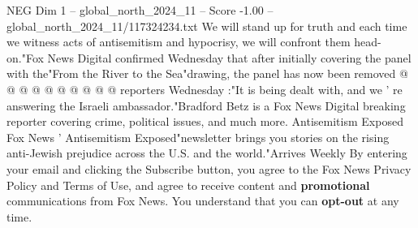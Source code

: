 \begin{textsample}{NEG Dim 1 – global\_north\_2024\_11 – Score -1.00 – global\_north\_2024\_11/117324234.txt}
We will stand up for truth and each time we witness acts of antisemitism and hypocrisy, we will confront them head-on."Fox News Digital confirmed Wednesday that after initially covering the panel with the"From the River to the Sea"drawing, the panel has now been removed @ @ @ @ @ @ @ @ @ @ reporters Wednesday :"It is being dealt with, and we ' re answering the Israeli ambassador."Bradford Betz is a Fox News Digital breaking reporter covering crime, political issues, and much more.
Antisemitism Exposed Fox News ' Antisemitism Exposed"newsletter brings you stories on the rising anti-Jewish prejudice across the U.S. and the world."Arrives Weekly By entering your email and clicking the Subscribe button, you agree to the Fox News Privacy Policy and Terms of Use, and agree to receive content and \textbf{promotional} communications from Fox News.
You understand that you can \textbf{opt-out} at any time.

\end{textsample}

